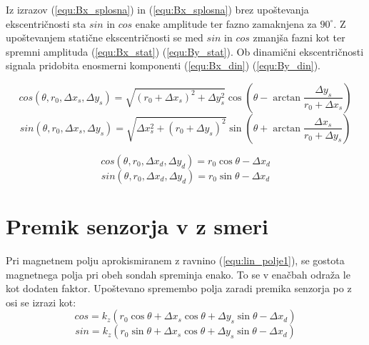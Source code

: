 Iz izrazov (\ref{equ:Bx_splosna}) in (\ref{equ:Bx_splosna}) brez upoštevanja ekscentričnosti sta $sin$ in $cos$ enake amplitude ter fazno zamaknjena za $90^\circ$. Z upoštevanjem statične ekscentričnosti se med $sin$ in $cos$ zmanjša fazni kot ter spremni amplituda (\ref{equ:Bx_stat}) (\ref{equ:By_stat}). Ob dinamični ekscentričnosti signala pridobita enosmerni komponenti (\ref{equ:Bx_din}) (\ref{equ:By_din}).


\begin{equation}
\label{equ:Bx_stat}
cos(\theta,r_0,\Delta x_s, \Delta y_s)= \sqrt{(r_0+\Delta x_s)^2+\Delta y_s^2}\cos(\theta -\arctan \frac{\Delta y_s}{r_0+\Delta x_s})
\end{equation}
\begin{equation}\label{equ:By_stat}
sin(\theta,r_0,\Delta x_s, \Delta y_s)= \sqrt{\Delta x_s^2+(r_0+\Delta y_s)^2} \sin(\theta +\arctan \frac{\Delta x_s}{r_0+\Delta y_s})
\end{equation}


\begin{equation}
\label{equ:Bx_din}
cos(\theta,r_0, \Delta x_d, \Delta y_d)= r_0 \cos\theta-\Delta x_d
\end{equation}
\begin{equation}
\label{equ:By_din}
sin(\theta,r_0, \Delta x_d, \Delta y_d)= r_0 \sin\theta-\Delta x_d
\end{equation}
\section{Premik senzorja v z smeri}

Pri magnetnem polju aprokismiranem z ravnino (\ref{equ:lin_polje1}), se gostota magnetnega polja pri obeh sondah spreminja enako. To se v enačbah odraža le kot dodaten faktor. Upoštevano spremembo polja zaradi premika senzorja po z osi se izrazi kot:
\begin{equation}\label{equ:Bx_z}
cos=k_z( r_0 \cos\theta +\Delta x_s \cos\theta +\Delta y_s \sin\theta -\Delta x_d)
\end{equation}
\begin{equation}\label{equ:By_z}
sin=k_z( r_0 \sin\theta +\Delta x_s \cos\theta +\Delta y_s \sin\theta-\Delta x_d)
\end{equation}


